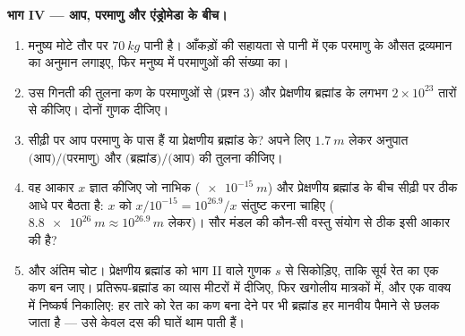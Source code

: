 \begin{problem}
\medskip
\noindent\textbf{भाग IV --- आप, परमाणु और एंड्रोमेडा के बीच।}
\begin{enumerate}[resume]
  \item मनुष्य मोटे तौर पर $\qty{70}{kg}$ पानी है। आँकड़ों की सहायता से पानी
        में एक परमाणु के औसत द्रव्यमान का अनुमान लगाइए, फिर मनुष्य में
        परमाणुओं की संख्या का।
  \item उस गिनती की तुलना कण के परमाणुओं से (प्रश्न 3) और प्रेक्षणीय
        ब्रह्मांड के लगभग $2\times10^{23}$ तारों से कीजिए। दोनों गुणक दीजिए।
  \item सीढ़ी पर आप परमाणु के पास हैं या प्रेक्षणीय ब्रह्मांड के?
        अपने लिए $\qty{1.7}{m}$ लेकर अनुपात $\text{(आप)}/\text{(परमाणु)}$ और $\text{(ब्रह्मांड)}/\text{(आप)}$ की तुलना
        कीजिए।
  \item वह आकार $x$ ज्ञात कीजिए जो नाभिक ($\qty{e-15}{m}$) और प्रेक्षणीय
        ब्रह्मांड के बीच सीढ़ी पर ठीक आधे पर बैठता है: $x$ को
        $x / 10^{-15} = 10^{26.9} / x$ संतुष्ट करना चाहिए ($\qty{8.8e26}{m} \approx 10^{26.9}\,\unit{m}$ लेकर)। सौर मंडल की कौन-सी
        वस्तु संयोग से ठीक इसी आकार की है?
  \item और अंतिम चोट। प्रेक्षणीय ब्रह्मांड को भाग II वाले गुणक $s$
        से सिकोड़िए, ताकि सूर्य रेत का एक कण बन जाए। प्रतिरूप-ब्रह्मांड
        का व्यास मीटरों में दीजिए, फिर खगोलीय
        मात्रकों में, और एक वाक्य में निष्कर्ष निकालिए: हर तारे को रेत
        का कण बना देने पर भी ब्रह्मांड हर मानवीय पैमाने से छलक जाता है
        --- उसे केवल दस की घातें थाम पाती हैं।
\end{enumerate}
\end{problem}
